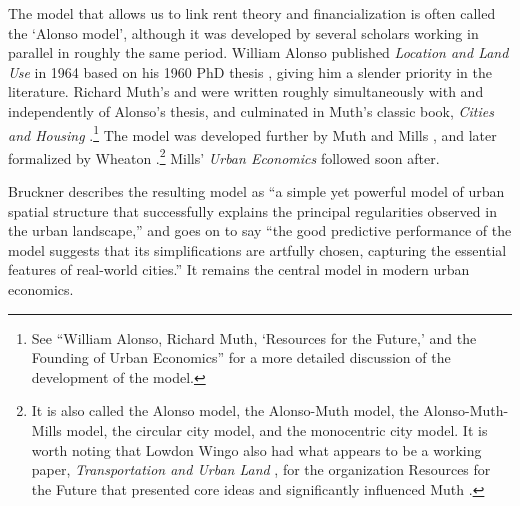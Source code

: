 The model that allows us to link rent theory and financialization %
is often called the `Alonso model', although it was developed by several scholars working in parallel in roughly the same period. William Alonso published \textit{Location and Land Use} in 1964  \cite{alonsoLocationLandUse1964} based on his 1960 PhD thesis \cite{alonsoModelUrbanLand1960},  
giving him a slender priority in the literature. 
Richard Muth's \cite{muthSpatialStructureHousing1961} and \cite{muthRationalExpectationsTheory1961} were written roughly simultaneously with and independently of Alonso's thesis, and culminated in Muth's classic book, \textit{Cities and Housing} \cite{muthCitiesHousingSpatial1969}.\footnote{See ``William Alonso, Richard Muth, `Resources for the Future,' and the Founding of Urban Economics'' \cite{mcdonaldWilliamAlonsoRichard2007} for a more detailed discussion of the development of the model.}  %
 The model was developed further by Muth \cite{muthCitiesHousingSpatial1969} and Mills \cite{millsAggregativeModelResource1967}, and later formalized by Wheaton \cite{wheatonComparativeStaticAnalysis1974}.\footnote{It is also called the Alonso model, the Alonso-Muth model, the Alonso-Muth-Mills model, the circular city model, and the monocentric city model. %
It is worth noting that Lowdon Wingo also had what appears to be a working paper, \textit{Transportation and Urban Land} \cite{wingoTransportationUrbanLand1961}, for the organization Resources for the Future %
that presented core ideas and significantly influenced Muth \cite{mcdonaldWilliamAlonsoRichard2007}.} Mills' \textit{Urban Economics} \cite{millsUrbanEconomics1972} followed soon after. 

 Bruckner \cite{bruecknerStructureUrbanEquilibria1987} describes the resulting model as ``a simple yet powerful model of urban spatial structure that successfully explains the principal regularities observed in the urban landscape,'' and goes on to say ``the good predictive performance of the model suggests that its simplifications are artfully chosen, capturing the essential features of real-world cities.'' It remains the central model in modern urban economics. 




